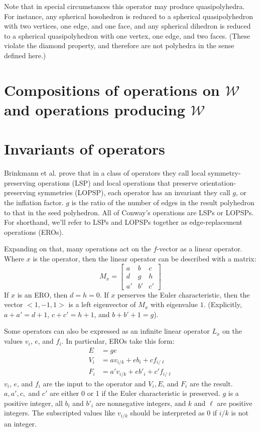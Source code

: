 \documentclass{article}
\begin{document}
Note that in special circumstances this operator may produce quasipolyhedra.
For instance, any spherical hosohedron is reduced to a spherical quasipolyhedron
with two vertices, one edge, and one face, and any spherical dihedron
is reduced to a spherical quasipolyhedron with one vertex, one edge, and
two faces. (These violate the diamond property, and therefore are not
polyhedra in the sense defined here.)

\section{Compositions of operations on $\mathcal{W}$ and
          operations producing $\mathcal{W}$}


\section{Invariants of operators}
Brinkmann et al. \cite{brinkmann} prove that in a class of operators they call
local symmetry-preserving operations (LSP) and local operations that preserve
orientation-preserving symmetries (LOPSP), each operator has an invariant they
call $g$, or the inflation factor. $g$ is the ratio of the number of edges
in the result polyhedron to that in the seed polyhedron. All of Conway's
operations are LSPs or LOPSPs. For shorthand, we'll refer to LSPs and LOPSPs
together as edge-replacement operations (EROs).

Expanding on that, many operations act on the $f$-vector as a linear operator.
Where $x$ is the operator, then the linear operator can be described with a
matrix:
\begin{equation}
  M_x = \begin{bmatrix}
  a & b & c \\
  d & g & h \\
  a' & b' & c' \end{bmatrix}
\end{equation}
If $x$ is an ERO, then $d = h= 0$. If $x$ perserves the Euler characteristic,
then the vector $<1,-1,1>$ is a left eigenvector of $M_x$ with eigenvalue $1$.
(Explicitly, $a + a' = d + 1$, $c+ c' = h+1$, and $b + b' + 1 = g$).

Some operators can also be expressed as an infinite linear operator $L_x$ on
the values $v_i$, $e$, and $f_i$. In particular, EROs take this form:
\begin{equation}
  \begin{split}
  E & = ge \\
  V_i & = a v_{i/k} + e b_i + c f_{i/\ell} \\
  F_i & = a' v_{i/k} + e b'_i + c' f_{i/\ell}
  \end{split}
\end{equation}
$v_i$, $e$, and $f_i$ are the input to the operator and $V_i, E$, and $F_i$ are
the result. $a, a', c,$ and $c'$ are either 0 or 1 if the Euler characteristic
is preserved. $g$ is a positive integer, all $b_i$ and $b'_i$ are nonnegative
integers, and $k$ and $\ell$ are positive integers. The subscripted values like
$v_{i/k}$ should be interpreted as 0 if $i/k$ is not an integer.
\end{document}
